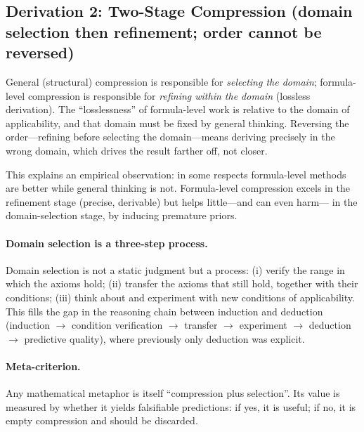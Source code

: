 \subsection{Derivation 2: Two-Stage Compression (domain selection then refinement; order cannot be reversed)}
\label{sec:twostage}

General (structural) compression is responsible for \emph{selecting the domain};
formula-level compression is responsible for \emph{refining within the domain}
(lossless derivation). The ``losslessness'' of formula-level work is relative to
the domain of applicability, and that domain must be fixed by general thinking.
Reversing the order---refining before selecting the domain---means deriving
precisely in the wrong domain, which drives the result farther off, not closer.

This explains an empirical observation: in some respects formula-level methods
are better while general thinking is not. Formula-level compression excels in
the refinement stage (precise, derivable) but helps little---and can even harm---
in the domain-selection stage, by inducing premature priors.

\paragraph{Domain selection is a three-step process.}
Domain selection is not a static judgment but a process: (i) verify the range in
which the axioms hold; (ii) transfer the axioms that still hold, together with
their conditions; (iii) think about and experiment with new conditions of
applicability. This fills the gap in the reasoning chain between induction and
deduction (induction $\to$ condition verification $\to$ transfer $\to$
experiment $\to$ deduction $\to$ predictive quality), where previously only
deduction was explicit.

\paragraph{Meta-criterion.}
Any mathematical metaphor is itself ``compression plus selection''. Its value is
measured by whether it yields falsifiable predictions: if yes, it is useful; if
no, it is empty compression and should be discarded.
